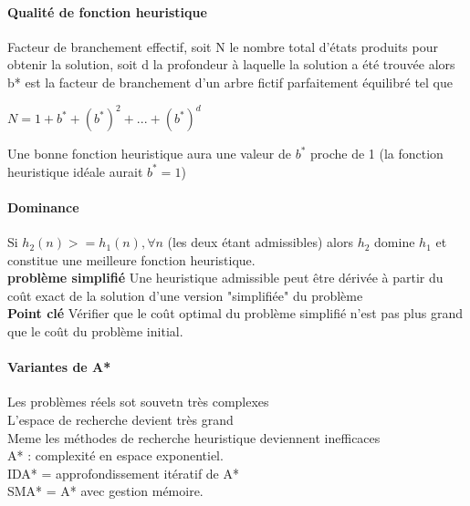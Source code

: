\documentclass{article}
\begin{document}
\paragraph{Qualité de fonction heuristique} Facteur de branchement effectif, soit N le nombre total d'états produits pour obtenir la solution, soit d la profondeur à laquelle la solution a été trouvée alors b* est la facteur de branchement d'un arbre fictif parfaitement équilibré tel que
\begin{center}
$ N = 1 + b^{*} + (b^{*})^{2} +...+ (b^{*})^{d}$
\end{center} 
Une bonne fonction heuristique aura une valeur de $b^{*}$ proche de 1 (la fonction heuristique idéale aurait $b^{*}= 1$)
\paragraph{Dominance} Si $h_{2}(n) >= h_{1}(n), \forall n $ (les deux étant admissibles) alors $h_{2}$ domine $h_{1}$ et constitue une meilleure fonction heuristique. \\\textbf{problème simplifié} Une heuristique admissible peut être dérivée à partir du coût exact de la solution d'une version "simplifiée" du problème \\\textbf{Point clé } Vérifier que le coût optimal du problème simplifié n'est pas plus grand que le coût du problème initial.
\paragraph{Variantes de A*} Les problèmes réels sot souvetn très complexes\\L'espace de recherche devient très grand\\Meme les méthodes de recherche heuristique deviennent inefficaces\\A* : complexité en espace exponentiel.\\IDA* = approfondissement itératif de A*\\SMA* = A* avec gestion mémoire.
\end{document}
